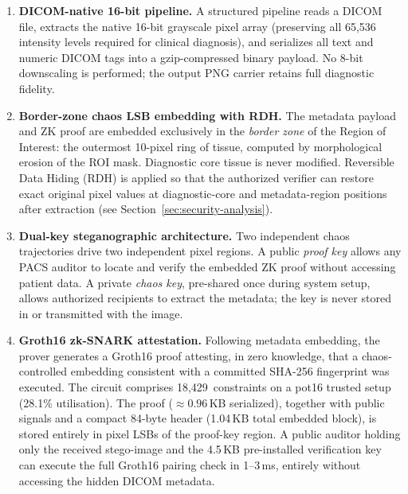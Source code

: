 \documentclass{jstarticle}
\begin{document}
\begin{enumerate}
  \item \textbf{DICOM-native 16-bit pipeline.}
    A structured pipeline reads a DICOM file, extracts the native 16-bit
    grayscale pixel array (preserving all 65,536 intensity levels required
    for clinical diagnosis), and serializes all text and numeric DICOM tags
    into a gzip-compressed binary payload.
    No 8-bit downscaling is performed; the output PNG carrier retains full
    diagnostic fidelity.

  \item \textbf{Border-zone chaos LSB embedding with RDH.}
    The metadata payload and ZK proof are embedded exclusively in the
    \emph{border zone} of the Region of Interest: the outermost 10-pixel
    ring of tissue, computed by morphological erosion of the ROI mask.
    Diagnostic core tissue is never modified.
    Reversible Data Hiding (RDH) is applied so that the authorized verifier
    can restore exact original pixel values at diagnostic-core and metadata-region positions after extraction (see Section~\ref{sec:security-analysis}).

  \item \textbf{Dual-key steganographic architecture.}
    Two independent chaos trajectories drive two independent pixel regions.
    A public \emph{proof key} allows any PACS auditor to locate and verify
    the embedded ZK proof without accessing patient data.
    A private \emph{chaos key}, pre-shared once during system setup,
    allows authorized recipients to extract the metadata; the key is never
    stored in or transmitted with the image.

  \item \textbf{Groth16 zk-SNARK attestation.}
    Following metadata embedding, the prover generates a Groth16 proof
    attesting, in zero knowledge, that a chaos-controlled embedding
    consistent with a committed SHA-256 fingerprint was executed.
    The circuit comprises 18,429~constraints on a pot16 trusted setup
    (28.1\% utilisation).
    The proof ($\approx 0.96$\,KB serialized), together with public signals
    and a compact 84-byte header (1.04\,KB total embedded block), is stored entirely in pixel LSBs
    of the proof-key region.
    A public auditor holding only the received stego-image and the
    4.5\,KB pre-installed verification key can execute the full Groth16
    pairing check in 1--3\,ms, entirely without accessing the hidden
    DICOM metadata.
\end{enumerate}
\end{document}
